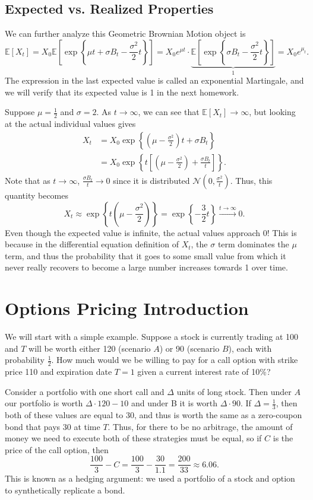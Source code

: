 \subsection{Expected vs. Realized Properties}
We can further analyze this Geometric Brownian Motion object is $$ \mathbb E[X_t] = X_0 \mathbb E \left[ \exp\left\{\mu t+\sigma B_t - \frac{\sigma^2}{2}t\right\} \right] = X_0 e^{\mu t} \cdot \underbrace{\mathbb E \left[ \exp \left\{ \sigma B_t - \frac{\sigma^2}{2} t \right\}  \right]}_{1} = X_0 e^{\mu_t}. $$ The expression in the last expected value is called an exponential Martingale, and we will verify that its expected value is 1 in the next homework. 

Suppose $\mu=\frac{1}{2}$ and $\sigma=2$. As $t\to\infty$, we can see that $\mathbb E[X_t]\to\infty$, but looking at the actual individual values gives \begin{align*} X_t &= X_0\exp \left\{ \left( \mu-\frac{\sigma^2}{2} \right) t + \sigma B_t \right\} \\
		&= X_0 \exp \left\{ t \left[ \left( \mu-\frac{\sigma^2}{2} \right) + \frac{\sigma B_t}{t} \right]  \right\} .
\end{align*} Note that as $t\to\infty$, $\frac{\sigma B_t}{t}\to 0$ since it is distributed $\mathcal N \left( 0,\frac{\sigma^2}{t} \right)$. Thus, this quantity becomes $$ X_t\approx \exp \left\{ t \left( \mu-\frac{\sigma^2}{2} \right)  \right\} = \exp \left\{ -\frac{3}{2}t \right\} \overset{t\to\infty}{\longrightarrow} 0. $$ Even though the expected value is infinite, the actual values approach 0! This is because in the differential equation definition of $X_t$, the $\sigma$ term dominates the $\mu$ term, and thus the probability that it goes to some small value from which it never really recovers to become a large number increases towards 1 over time.

\section{Options Pricing Introduction}
We will start with a simple example. Suppose a stock is currently trading at 100 and $T$ will be worth either 120 (scenario $A$) or 90 (scenario $B$), each with probability $\frac{1}{2}$. How much would we be willing to pay for a call option with strike price 110 and expiration date $T=1$ given a current interest rate of 10\%?

Consider a portfolio with one short call and $\Delta$ units of long stock. Then under $A$ our portfolio is worth $\Delta\cdot 120 - 10$ and under B it is worth $\Delta\cdot 90$. If $\Delta=\frac{1}{3}$, then both of these values are equal to $30$, and thus is worth the same as a zero-coupon bond that pays $30$ at time $T$. Thus, for there to be no arbitrage, the amount of money we need to execute both of these strategies must be equal, so if $C$ is the price of the call option, then $$ \frac{100}{3} - C = \frac{100}{3} - \frac{30}{1.1} = \frac{200}{33}\approx 6.06. $$ This is known as a hedging argument: we used a portfolio of a stock and option to synthetically replicate a bond.

